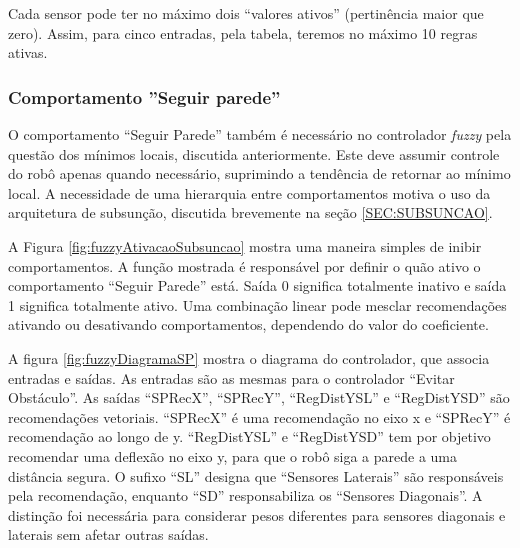 	
	
	Cada sensor pode ter no máximo dois ``valores ativos'' (pertinência maior que zero). Assim,
	para cinco entradas, pela tabela, teremos no máximo 10 regras ativas. 
	 
	\subsubsection{Comportamento ''Seguir parede''}

	O comportamento ``Seguir Parede'' também é necessário no controlador \textit{fuzzy} pela 
	questão dos mínimos locais, discutida anteriormente. Este deve assumir controle do robô 
	apenas quando necessário, suprimindo a tendência de retornar ao mínimo local. A necessidade 
	de uma hierarquia entre comportamentos motiva o uso da arquitetura de subsunção, discutida 
	brevemente na seção \ref{SEC:SUBSUNCAO}.
	
	A Figura \ref{fig:fuzzyAtivacaoSubsuncao} mostra uma maneira simples de inibir 
	comportamentos. A função mostrada é responsável por definir o quão ativo o comportamento 
	``Seguir Parede'' está. Saída 0 significa totalmente inativo e saída 1 significa totalmente
	ativo. Uma combinação linear pode mesclar recomendações ativando ou desativando 
	comportamentos, dependendo do valor do coeficiente. 
	
	
	
	A figura \ref{fig:fuzzyDiagramaSP} mostra o diagrama do controlador, que associa entradas 
	e saídas. As entradas são as mesmas para o controlador ``Evitar Obstáculo''. As saídas
	``SPRecX'', ``SPRecY'', ``RegDistYSL'' e ``RegDistYSD'' são recomendações vetoriais. 
	``SPRecX'' é uma recomendação no eixo x e ``SPRecY'' é recomendação ao longo de y. 
	``RegDistYSL'' e ``RegDistYSD'' tem por objetivo recomendar uma deflexão no eixo y, para
	que o robô siga a parede a uma distância segura. O sufixo ``SL'' designa que ``Sensores 
	Laterais'' são responsáveis pela recomendação, enquanto ``SD'' responsabiliza os 
	``Sensores Diagonais''. A distinção foi necessária para considerar pesos diferentes para
	sensores diagonais e laterais sem afetar outras saídas.
	
	
	
